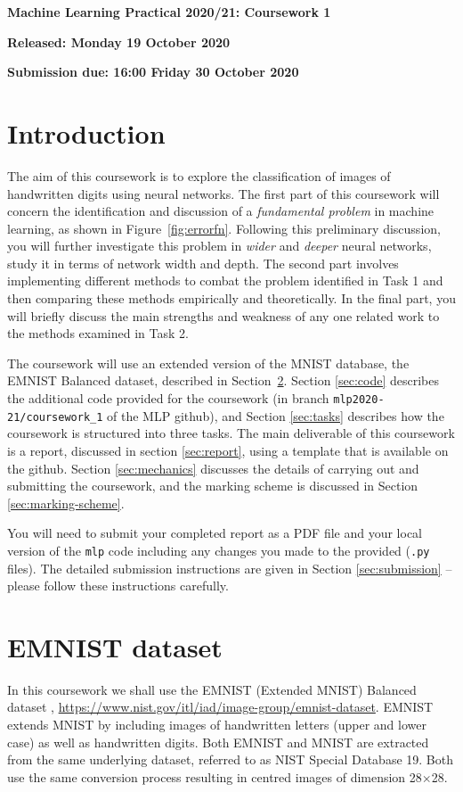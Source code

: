 \documentclass[11pt,]{article}
\begin{document}
\begin{center}
\textsf{\textbf{\Large Machine Learning Practical 2020/21: Coursework 1}}

\bigskip
\textbf{Released: Monday 19 October 2020}

\textbf{Submission due: 16:00 Friday 30 October 2020}
\end{center}
\section{Introduction}
\label{sec:introduction}

The aim of this coursework is to explore the classification of images of handwritten digits using neural networks. 
The first part of this coursework will concern the identification and discussion of a \textit{fundamental problem} in machine learning, as shown in Figure~\ref{fig:errorfn}. 
Following this preliminary discussion, you will further investigate this problem in \textit{wider} and \textit{deeper} neural networks, study it in terms of network width and depth. 
The second part involves implementing different methods to combat the problem identified in Task 1 and then comparing these methods empirically and theoretically. 
In the final part, you will briefly discuss the main strengths and weakness of any one related work to the methods examined in Task 2. 

The coursework will use an extended version of the MNIST database, the EMNIST Balanced dataset, described in Section~\ref{sec:emnist}.  Section \ref{sec:code} describes the additional code provided for the coursework (in branch \texttt{mlp2020-21/coursework\_1} of the MLP github), and Section \ref{sec:tasks} describes how the coursework is structured into three tasks. 
The main deliverable of this coursework is a report, discussed in section \ref{sec:report}, using a template that is available on the github. 
Section \ref{sec:mechanics} discusses the details of carrying out and submitting the coursework, and the marking scheme is discussed in Section \ref{sec:marking-scheme}.

You will need to submit your completed report as a PDF file  and your local version of the \texttt{mlp} code including any changes you made to the provided (\texttt{.py} files).  
The detailed submission instructions are given in Section \ref{sec:submission} -- please follow these instructions carefully.

\section{EMNIST dataset}
\label{sec:emnist}
In this coursework we shall use the  EMNIST  (Extended MNIST) Balanced dataset \citep{cohen2017emnist}, \url{https://www.nist.gov/itl/iad/image-group/emnist-dataset}. EMNIST extends MNIST by including images of handwritten letters (upper and lower case) as well as handwritten digits. Both EMNIST and MNIST are extracted from the same underlying dataset, referred to as NIST Special Database 19.  Both use the same conversion process resulting in centred images of dimension 28$\times$28.  
\end{document}
